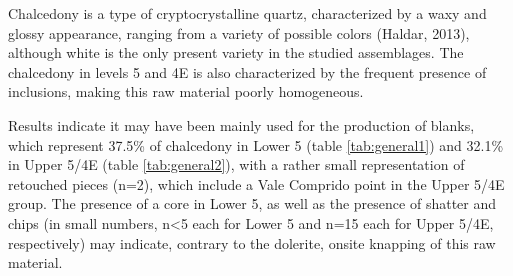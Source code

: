 \documentclass[12pt,twoside]{reedthesis}
\begin{document}
Chalcedony is a type of cryptocrystalline quartz, characterized by a waxy and glossy appearance, ranging from a variety of possible colors (Haldar, 2013), although white is the only present variety in the studied assemblages. The chalcedony in levels 5 and 4E is also characterized by the frequent presence of inclusions, making this raw material poorly homogeneous.

Results indicate it may have been mainly used for the production of blanks, which represent 37.5\% of chalcedony in Lower 5 (table \ref{tab:general1}) and 32.1\% in Upper 5/4E (table \ref{tab:general2}), with a rather small representation of retouched pieces (n=2), which include a Vale Comprido point in the Upper 5/4E group. The presence of a core in Lower 5, as well as the presence of shatter and chips (in small numbers, n\textless5 each for Lower 5 and n=15 each for Upper 5/4E, respectively) may indicate, contrary to the dolerite, onsite knapping of this raw material.
\end{document}
